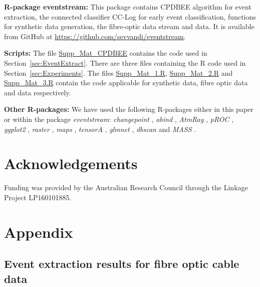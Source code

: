 \documentclass[a4paper,11pt]{article}
\begin{document}
\textbf{R-package eventstream:} This package contains CPDBEE algorithm for event extraction, the connected classifier CC-Log for early event classification, functions for synthetic data generation, the fibre-optic data stream and  data. It is available from GitHub at \url{https://github.com/sevvandi/eventstream}.

\textbf{Scripts:} The file \url{Supp_Mat_CPDBEE} contains the code used in Section~\ref{sec:EventExtract}. There are three files containing the R code used in Section~\ref{sec:Experiments}. The files \url{Supp_Mat_1.R}, \url{Supp_Mat_2.R} and \url{Supp_Mat_3.R} contain the code applicable for synthetic data,  fibre optic data and  data respectively.

\textbf{Other R-packages:} We have used the following R-packages either in this paper or within the package \textit{eventstream}:
  \textit{changepoint} \citep{killick2014changepoint},
  \textit{abind} \citep{abind},
  \textit{AtmRay} \citep{atmray},
  \textit{pROC} \citep{proc},
  \textit{ggplot2} \citep{ggplot2},
  \textit{raster} \citep{raster},
  \textit{maps} \citep{maps},
  \textit{tensorA} \citep{tensorA},
  \textit{glmnet} \citep{glmnet},
  \textit{dbscan} \citep{dbscan} and
  \textit{MASS} \citep{MASS}.

\section*{Acknowledgements}

Funding was provided by the Australian Research Council through the Linkage Project LP160101885.
\newpage
\footnotesize\parskip=0cm


\newpage
\appendix
\section{Appendix}\label{sec:App1}

\subsection{Event extraction results for fibre optic cable data}
\end{document}
